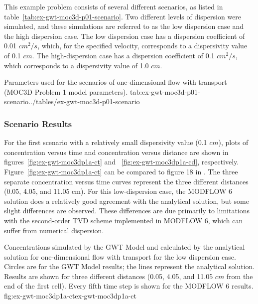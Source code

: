 This example problem consists of several different scenarios, as listed in table~\ref{tab:ex-gwt-moc3d-p01-scenario}.  Two different levels of dispersion were simulated, and these simulations are referred to as the low dispersion case and the high dispersion case.  The low dispersion case has a dispersion coefficient of 0.01 $cm^2/s$, which, for the specified velocity, corresponds to a dispersivity value of 0.1 $cm$.  The high-dispersion case has a dispersion coefficient of 0.1 $cm^2/s$, which corresponds to a dispersivity value of 1.0 $cm$.

\begin{ScenarioTable}{
                                   Parameters used for the scenarios of one-dimensional flow with transport (MOC3D Problem 1 model parameters).
                                   }{tab:ex-gwt-moc3d-p01-scenario}{../tables/ex-gwt-moc3d-p01-scenario}
\end{ScenarioTable}

\subsubsection{Scenario Results}

For the first scenario with a relatively small dispersivity value (0.1 $cm$), plots of concentration versus time and concentration versus distance are shown in figures~\ref{fig:ex-gwt-moc3dp1a-ct} and ~\ref{fig:ex-gwt-moc3dp1a-cd}, respectively.  Figure~\ref{fig:ex-gwt-moc3dp1a-ct} can be compared to figure 18 in \cite{konikow1996three}. The three separate concentration versus time curves represent the three different distances (0.05, 4.05, and 11.05 cm).  For this low-dispersion case, the MODFLOW 6 solution does a relatively good agreement with the analytical solution, but some slight differences are observed.  These differences are due primarily to limitations with the second-order TVD scheme implemented in MODFLOW 6, which can suffer from numerical dispersion.

\begin{StandardFigure}{
                                     Concentrations simulated by the \mf GWT Model and calculated by the analytical solution for one-dimensional flow with transport for the low dispersion case.  Circles are for the GWT Model results; the lines represent the analytical solution.  Results are shown for three different distances (0.05, 4.05, and 11.05 $cm$ from the end of the first cell).  Every fifth time step is shown for the MODFLOW 6 results.
                                     }{fig:ex-gwt-moc3dp1a-ct}{ex-gwt-moc3dp1a-ct}
\end{StandardFigure}            

